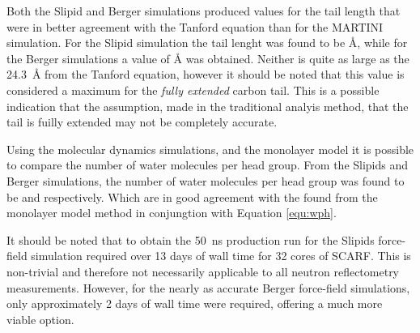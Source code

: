 \documentclass[amsmath,amssymb,twocolumn,superscriptaddress,aps,prl]{revtex4-1}
\begin{document}
Both the Slipid and Berger simulations produced values for the tail length that were in better agreement with the Tanford equation than for the MARTINI simulation. 
For the Slipid simulation the tail lenght was found to be \si{\angstrom}, while for the Berger simulations a value of \si{\angstrom} was obtained. 
Neither is quite as large as the \SI{24.3}{\angstrom} from the Tanford equation, however it should be noted that this value is considered a maximum for the \emph{fully extended} carbon tail.
This is a possible indication that the assumption, made in the traditional analyis method, that the tail is fuilly extended may not be completely accurate. 

Using the molecular dynamics simulations, and the monolayer model it is possible to compare the number of water molecules per head group. 
From the Slipids and Berger simulations, the number of water molecules per head group was found to be  and  respectively.
Which are in good agreement with the  found from the monolayer model method in conjungtion with Equation \ref{equ:wph}.

It should be noted that to obtain the \SI{50}{\nano\second} production run for the Slipids force-field simulation required over 13 days of wall time for 32 cores of SCARF.
This is non-trivial and therefore not necessarily applicable to all neutron reflectometry measurements.
However, for the nearly as accurate Berger force-field simulations, only approximately 2 days of wall time were required, offering a much more viable option.
\end{document}
